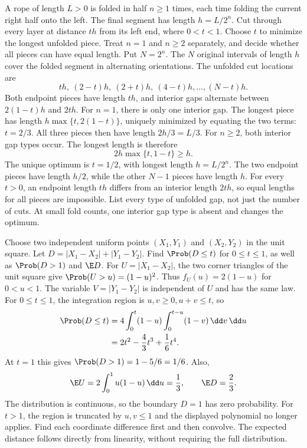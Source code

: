 A rope of length $L>0$ is folded in half $n\ge1$ times, each time folding the current right half onto the left. The final segment has length $h=L/2^n$. Cut through every layer at distance $th$ from its left end, where $0<t<1$. Choose $t$ to minimize the longest unfolded piece. Treat $n=1$ and $n\ge2$ separately, and decide whether all pieces can have equal length.
\solution Put $N=2^n$. The $N$ original intervals of length $h$ cover the folded segment in alternating orientations. The unfolded cut locations are
\[
 th,\ (2-t)h,\ (2+t)h,\ (4-t)h,\ldots,(N-t)h.
\]
Both endpoint pieces have length $th$, and interior gaps alternate between $2(1-t)h$ and $2th$.
For $n=1$, there is only one interior gap. The longest piece has length $h\max\{t,2(1-t)\}$, uniquely minimized by equating the two terms: $t=2/3$. All three pieces then have length $2h/3=L/3$.
For $n\ge2$, both interior gap types occur. The longest length is therefore
\[
 2h\max\{t,1-t\}\ge h.
\]
The unique optimum is $t=1/2$, with longest length $h=L/2^n$. The two endpoint pieces have length $h/2$, while the other $N-1$ pieces have length $h$. For every $t>0$, an endpoint length $th$ differs from an interior length $2th$, so equal lengths for all pieces are impossible.
\insight List every type of unfolded gap, not just the number of cuts. At small fold counts, one interior gap type is absent and changes the optimum.

Choose two independent uniform points $(X_1,Y_1)$ and $(X_2,Y_2)$ in the unit square. Let $D=|X_1-X_2|+|Y_1-Y_2|$. Find $\Prob(D\le t)$ for $0\le t\le1$, as well as $\Prob(D>1)$ and $\E D$.
\solution For $U=|X_1-X_2|$, the two corner triangles of the unit square give $\Prob(U>u)=(1-u)^2$. Thus $f_U(u)=2(1-u)$ for $0<u<1$. The variable $V=|Y_1-Y_2|$ is independent of $U$ and has the same law.
For $0\le t\le1$, the integration region is $u,v\ge0,u+v\le t$, so
\[
 \begin{aligned}
 \Prob(D\le t)
 &=4\int_0^t(1-u)\int_0^{t-u}(1-v)\,\dd v\,\dd u\\
 &=2t^2-\frac43t^3+\frac16t^4.
 \end{aligned}
\]
At $t=1$ this gives $\Prob(D>1)=1-5/6=1/6$. Also,
\[
 \E U=2\int_0^1u(1-u)\,\dd u=\frac13,
 \qquad\E D=\frac23.
\]
The distribution is continuous, so the boundary $D=1$ has zero probability. For $t>1$, the region is truncated by $u,v\le1$ and the displayed polynomial no longer applies.
\insight Find each coordinate difference first and then convolve. The expected distance follows directly from linearity, without requiring the full distribution.

